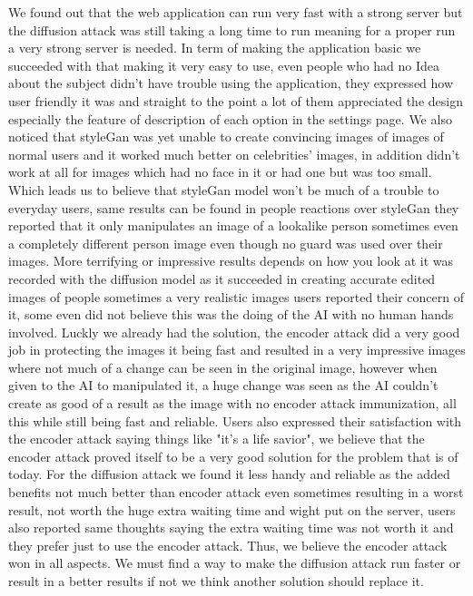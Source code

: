 \documentclass[sigconf]{acmart}
\begin{document}
We found out that the web application can run very fast with a strong server but the diffusion attack was still taking a long time to run meaning for a proper run a very strong server is needed. In term of making the application basic we succeeded with that making it very easy to use, even people who had no Idea about the subject didn't have trouble using the application, they expressed how user friendly it was and straight to the point a lot of them appreciated the design especially the feature of description of each option in the settings page. We also noticed that styleGan was yet unable to create convincing images of images of normal users and it worked much better on celebrities' images, in addition didn't work at all for images which had no face in it or had one but was too small. Which leads us to believe that styleGan model won't be much of a trouble to everyday users, same results can be found in people reactions over styleGan they reported that it only manipulates an image of a lookalike person sometimes even a completely different person image even though no guard was used over their images. More terrifying or impressive results depends on how you look at it was recorded with the diffusion model as it succeeded in creating accurate edited images of people sometimes a very realistic images users reported their concern of it, some even did not believe this was the doing of the AI with no human hands involved. Luckly we already had the solution, the encoder attack did a very good job in protecting the images it being fast and resulted in a very impressive images where not much of a change can be seen in the original image, however when given to the AI to manipulated it, a huge change was seen as the AI couldn’t create as good of a result as the image with no encoder attack immunization, all this while still being fast and reliable. Users also expressed their satisfaction with the encoder attack saying things like "it's a life savior", we believe that the encoder attack proved itself to be a very good solution for the problem that is of today. For the diffusion attack we found it less handy and reliable as the added benefits not much better than encoder attack even sometimes resulting in a worst result, not worth the huge extra waiting time and wight put on the server, users also reported same thoughts saying the extra waiting time was not worth it and they prefer just to use the encoder attack. Thus, we believe the encoder attack won in all aspects. We must find a way to make the diffusion attack run faster or result in a better results if not we think another solution should replace it. 
\end{document}
